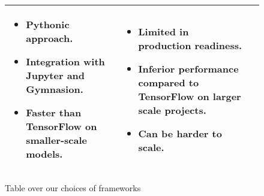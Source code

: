 \begin{figure}[H]
{\begin{tabular}{| m{3.5cm} | m{5cm} | m{5cm} |}
\begin{itemize}
                        \item Pythonic approach.
                        \item Integration with Jupyter and Gymnasion.
                        \item Faster than TensorFlow on smaller-scale models.
                  \end{itemize}                &
                  \begin{itemize}
                        \item Limited in production readiness.
                        \item Inferior performance compared to TensorFlow on larger scale projects.
                        \item Can be harder to scale.
                  \end{itemize}                           \\
                  \hline
            \end{tabular}
      }
      \caption{Table over our choices of frameworks}
      \label{tab:frameworks}
\end{figure}
